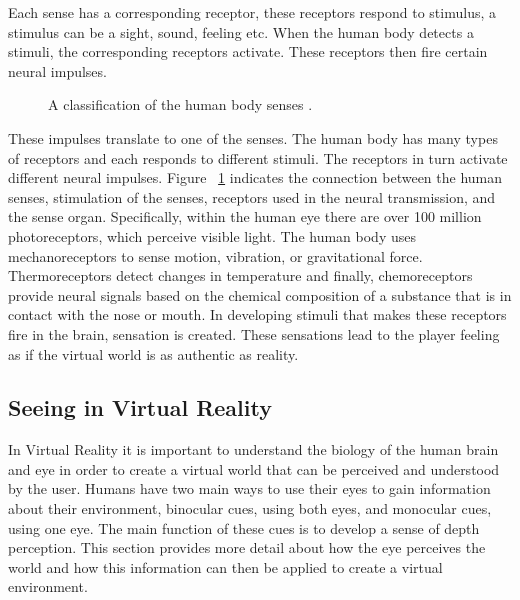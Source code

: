 Each sense has a corresponding receptor, these receptors respond to stimulus, a stimulus can be a sight, sound, feeling etc. When the human body detects a stimuli, the corresponding receptors activate. These receptors then fire certain neural impulses. 
\begin{figure}[!ht]
	\begin{center}
	\end{center}
	\caption{A classification of the human body senses \cite{LaValle2017}.} \label{fig:HumanSences}
\end{figure}These impulses translate to one of the senses. The human body has many types of receptors and each responds to different stimuli. The receptors in turn activate different neural impulses. Figure ~\ref{fig:HumanSences} indicates the connection between the human senses, stimulation of the senses, receptors used in the neural transmission, and the sense organ. Specifically, within the human eye there are over 100 million photoreceptors, which perceive visible light. The human body uses mechanoreceptors to sense motion, vibration, or gravitational force. Thermoreceptors detect changes in temperature and finally, chemoreceptors provide neural signals based on the chemical composition of a substance that is in contact with the nose or mouth. In developing stimuli that makes these receptors fire in the brain, sensation is created. These sensations lead  to the player feeling as if the virtual world is as authentic as reality.

\subsection{Seeing in Virtual Reality}
In Virtual Reality it is important to understand the biology of the human brain and eye in order to create a virtual world that can be perceived and understood by the user. Humans have two main ways to use their eyes to gain information about their environment, binocular cues, using both eyes, and monocular cues, using one eye. The main function of these cues is to develop a sense of depth perception. This section provides more detail about how the eye perceives the world and how this information can then be applied to create a virtual environment.


